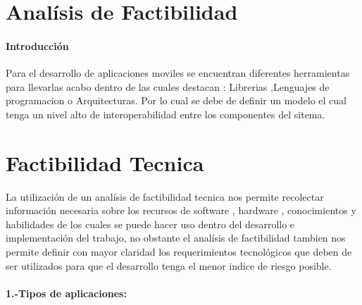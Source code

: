 \section{Analísis de Factibilidad}
\paragraph{Introducción}
Para el desarrollo de aplicaciones moviles se encuentran diferentes herramientas para llevarlas acabo dentro de las cuales destacan :
Librerias ,Lenguajes de programacion o Arquitecturas.
Por lo cual se debe de definir un modelo el cual tenga un nivel alto de interoperabilidad entre los componentes del sitema.


\section{Factibilidad Tecnica}
La utilización de un analísis de factibilidad tecnica nos permite recolectar información necesaria sobre los recursos de software , hardware , conocimientos y habilidades de los cuales se puede hacer uso dentro del desarrollo e implementación del trabajo, no obstante el analísis de factibilidad tambien nos permite definir con mayor claridad los requerimientos tecnológicos que deben de ser utilizados para que el desarrollo tenga el menor indice de riesgo posible.


\paragraph{1.-Tipos de aplicaciones:}

